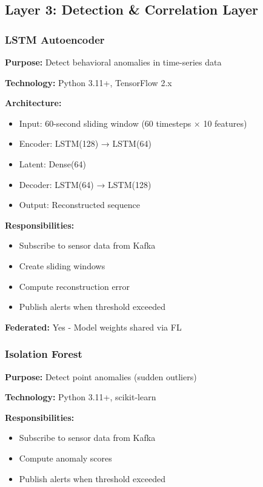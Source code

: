 \documentclass[12pt,a4paper]{article}
\begin{document}
\subsection{Layer 3: Detection \& Correlation Layer}

\subsubsection{LSTM Autoencoder}

\textbf{Purpose:} Detect behavioral anomalies in time-series data

\textbf{Technology:} Python 3.11+, TensorFlow 2.x

\textbf{Architecture:}
\begin{itemize}[leftmargin=1cm,itemsep=0pt]
    \item Input: 60-second sliding window (60 timesteps × 10 features)
    \item Encoder: LSTM(128) → LSTM(64)
    \item Latent: Dense(64)
    \item Decoder: LSTM(64) → LSTM(128)
    \item Output: Reconstructed sequence
\end{itemize}

\textbf{Responsibilities:}
\begin{itemize}[leftmargin=1cm,itemsep=0pt]
    \item Subscribe to sensor data from Kafka
    \item Create sliding windows
    \item Compute reconstruction error
    \item Publish alerts when threshold exceeded
\end{itemize}

\textbf{Federated:} Yes - Model weights shared via FL


\subsubsection{Isolation Forest}

\textbf{Purpose:} Detect point anomalies (sudden outliers)

\textbf{Technology:} Python 3.11+, scikit-learn

\textbf{Responsibilities:}
\begin{itemize}[leftmargin=1cm,itemsep=0pt]
    \item Subscribe to sensor data from Kafka
    \item Compute anomaly scores
    \item Publish alerts when threshold exceeded
\end{itemize}
\end{document}
